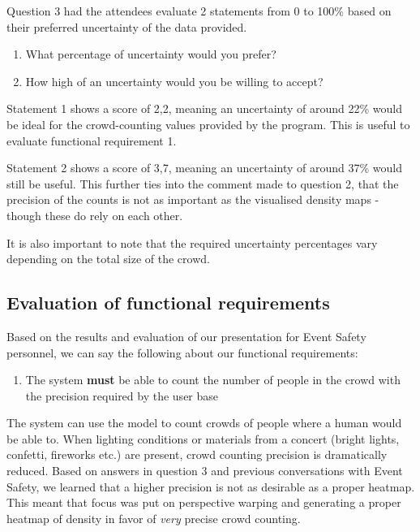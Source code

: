 \documentclass[
]{article}
\providecommand{\tightlist}{%
  \setlength{\itemsep}{0pt}\setlength{\parskip}{0pt}}\usepackage{longtable,booktabs,array}
\begin{document}
Question 3 had the attendees evaluate 2 statements from 0 to 100\% based
on their preferred uncertainty of the data provided.

\begin{enumerate}
\def\labelenumi{\arabic{enumi}.}
\item
  What percentage of uncertainty would you prefer?
\item
  How high of an uncertainty would you be willing to accept?
\end{enumerate}

Statement 1 shows a score of 2,2, meaning an uncertainty of around 22\%
would be ideal for the crowd-counting values provided by the program.
This is useful to evaluate functional requirement 1.

Statement 2 shows a score of 3,7, meaning an uncertainty of around 37\%
would still be useful. This further ties into the comment made to
question 2, that the precision of the counts is not as important as the
visualised density maps - though these do rely on each other.

It is also important to note that the required uncertainty percentages
vary depending on the total size of the crowd.

\hypertarget{sec-eval_functional_requirements}{%
\subsection{Evaluation of functional
requirements}\label{sec-eval_functional_requirements}}

Based on the results and evaluation of our presentation for Event Safety
personnel, we can say the following about our functional requirements:

\begin{enumerate}
\def\labelenumi{\arabic{enumi}.}
\tightlist
\item
  The system \textbf{must} be able to count the number of people in the
  crowd with the precision required by the user base
\end{enumerate}

The system can use the model to count crowds of people where a human
would be able to. When lighting conditions or materials from a concert
(bright lights, confetti, fireworks etc.) are present, crowd counting
precision is dramatically reduced. Based on answers in question 3 and
previous conversations with Event Safety, we learned that a higher
precision is not as desirable as a proper heatmap. This meant that focus
was put on perspective warping and generating a proper heatmap of
density in favor of \emph{very} precise crowd counting.
\end{document}
